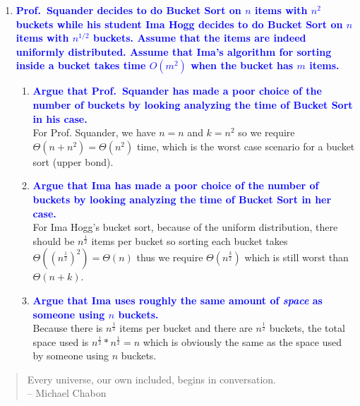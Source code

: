 \documentclass{article}
\begin{document}
\begin{enumerate}
\item \textbf{\textcolor{blue}{Prof.\ Squander decides to do Bucket Sort on $n$ items with $n^2$ buckets while his student Ima Hogg decides to do Bucket Sort on $n$ items with $n^{1/2}$ buckets. Assume that the items are indeed uniformly distributed. Assume that Ima's algorithm for sorting inside a bucket takes time $O(m^2)$ when the bucket has $m$ items.}}
    \begin{enumerate}
    \item \textbf{\textcolor{blue}{Argue that Prof.\ Squander has made a poor choice of the number of buckets by looking analyzing the time of Bucket Sort in his case.}}
        \\ For Prof. Squander, we have $n=n$ and $k=n^2$ so we require $\Theta(n + n^2)=\Theta(n^2)$ time, which is the worst case scenario for a bucket sort (upper bond).
    \item \textbf{\textcolor{blue}{Argue that Ima has made a poor choice of the number of buckets by looking analyzing the time of Bucket Sort in her case.}}
        \\ For Ima Hogg's bucket sort, because of the uniform distribution, there should be $n^\frac{1}{2}$ items per bucket so sorting each bucket takes $\Theta((n^\frac{1}{2})^2)=\Theta(n)$ thus we require $\Theta(n^\frac{3}{2})$ which is still worst than $\Theta(n + k)$.
    \item \textbf{\textcolor{blue}{Argue that Ima uses roughly the same amount of {\em space} as someone using $n$ buckets.}}
        \\ Because there is $n^\frac{1}{2}$ items per bucket and there are $n^{\frac{1}{2}}$ buckets, the total space used is $n^\frac{1}{2}*n^\frac{1}{2}=n$ which is obviously the same as the space used by someone using $n$ buckets.
    \end{enumerate}
\end{enumerate}

\begin{quote}
Every universe, our own included, begins in conversation.
\\ -- Michael Chabon
\end{quote}
\end{document}
